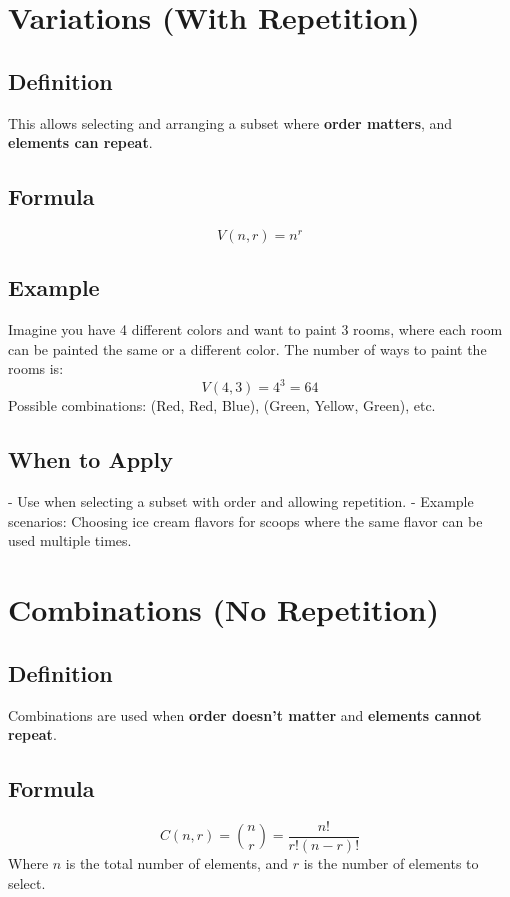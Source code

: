 \documentclass{article}
\begin{document}
\newpage
\section{Variations (With Repetition)}

\subsection{Definition}
This allows selecting and arranging a subset where \textbf{order matters}, and \textbf{elements can repeat}.

\subsection{Formula}
\[
V(n, r) = n^r
\]

\subsection{Example}
Imagine you have 4 different colors and want to paint 3 rooms, where each room can be painted the same or a different color. The number of ways to paint the rooms is:
\[
V(4, 3) = 4^3 = 64
\]
Possible combinations: (Red, Red, Blue), (Green, Yellow, Green), etc.

\subsection{When to Apply}
- Use when selecting a subset with order and allowing repetition.
- Example scenarios: Choosing ice cream flavors for scoops where the same flavor can be used multiple times.

\newpage
\section{Combinations (No Repetition)}

\subsection{Definition}
Combinations are used when \textbf{order doesn’t matter} and \textbf{elements cannot repeat}.

\subsection{Formula}
\[
C(n, r) = \binom{n}{r} = \frac{n!}{r!(n - r)!}
\]
Where \(n\) is the total number of elements, and \(r\) is the number of elements to select.
\end{document}
